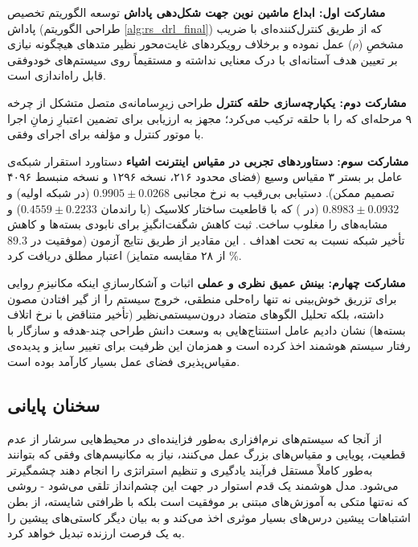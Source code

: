 \documentclass[oneside,openany,phd]{TMU-Thesis}
\begin{document}
\textbf{مشارکت اول: ابداع ماشین نوین جهت شکل‌دهی پاداش}
توسعه الگوریتم تخصیص پاداش (طراحی الگوریتم \ref{alg:rs_drl_final}) که از طریق کنترل‌کننده‌ای با ضریب مشخصِ ($\rho$) عمل نموده‌ و برخلاف رویکردهای غایت‌محور نظیر متدهای  هیچگونه نیازی بر تعیین هدف آستانه‌ای با درک معنایی نداشته و مستقیماً روی سیستم‌های خودوفقی قابل راه‌اندازی است.

\textbf{مشارکت دوم: یکپارچه‌سازی حلقه کنترل }
طراحی زیرِسامانه‌ی متصل متشکل از چرخه ۹ مرحله‌ای که  را با حلقه  ترکیب می‌کرد؛ مجهز به ارزیابی برای تضمین اعتبارِ زمانِ اجرا با موتور کنترل  و مؤلفه  برای اجرای وفقی.

\textbf{مشارکت سوم: دستاوردهای تجربی در مقیاس اینترنت اشیاء}
دستاورد استقرار شبکه‌ی عامل بر بستر ۳ مقیاس وسیع (فضای محدود ۲۱۶، نسخه ۱۲۹۶ و نسخه منبسط ۴۰۹۶ تصمیم ممکن). دستیابی بی‌رقیب به نرخ مجانبی $0.9905 \pm 0.0268$ (در شبکه اولیه) و $0.8983 \pm 0.0932$ (در ) که با قاطعیت ساختار کلاسیک  (با راندمان $0.4559 \pm 0.2233$) و مشابه‌های  را مغلوب ساخت. ثبت کاهش شگفت‌انگیزِ  برای نابودی بسته‌ها و  کاهش تأخیر شبکه‌ نسبت به  تحت اهداف . این مقادیر از طریق نتایج آزمون  (موفقیت در $89.3$\% از ۲۸ مقایسه متمایز) اعتبار مطلق دریافت کرد.

\textbf{مشارکت چهارم: بینش عمیق نظری و عملی}
اثبات و آشکارسازیِ اینکه مکانیزمِ روایی برای تزریق خوش‌بینی نه تنها راه‌حلی منطقی، خروج سیستم را از گیر افتادن مصون داشته، بلکه تحلیل الگوهای متضاد درون‌سیستمی‌نظیر (تأخیر متناقض با نرخ اتلاف بسته‌ها) نشان دادیم عامل استنتاج‌هایی به وسعت دانش طراحی چند-هدفه و سازگار با رفتار سیستم هوشمند اخذ کرده است و همزمان این ظرفیت برای تغییر سایز و پدیده‌ی مقیاس‌پذیری فضای عمل بسیار کارآمد بوده است.

\subsection{سخنان پایانی}

از آنجا که سیستم‌های نرم‌افزاری به‌طور فزاینده‌ای در محیط‌هایی سرشار از عدم قطعیت، پویایی و مقیاس‌های بزرگ عمل می‌کنند، نیاز به مکانیسم‌های وفقی که بتوانند به‌طور کاملاً مستقل فرآیند یادگیری و تنظیم استراتژی را انجام دهند چشمگیرتر می‌شود. مدل هوشمند  یک قدم استوار در جهت این چشم‌انداز تلقی می‌شود - روشی که نه‌تنها متکی به آموزش‌های مبتنی بر موفقیت است بلکه با ظرافتی شایسته، از بطن اشتباهات پیشین درس‌های بسیار موثری اخذ می‌کند و به بیان دیگر کاستی‌های پیشین را به یک فرصت ارزنده تبدیل خواهد کرد.
\end{document}
